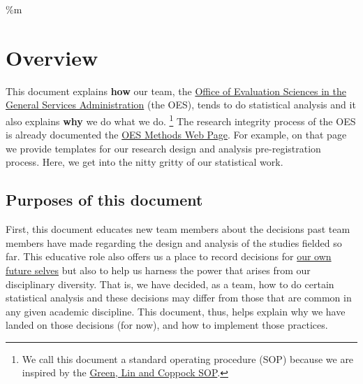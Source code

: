 \documentclass[
  12pt,
]{book}
\theoremstyle{definition}
\theoremstyle{definition}
\theoremstyle{definition}
\theoremstyle{remark}
\begin{document}
\newcommand{\var}{\mathrm{Var}}
\newcommand{\sd}{\mathrm{sd}}
\newcommand{\cov}{\mathrm{Cov}}
\newcommand{\cor}{\mathrm{Cor}}
\newcommand{\pr}{\text{Pr}}
\newcommand{\rank}{\text{rank}}
\newcommand{\Dt}{\Delta t}
\newcommand{\by}{\mathbf{y}}
\newcommand{\bY}{\mathbf{Y}}
\newcommand{\br}{\mathbf{r}}
\newcommand{\bv}{\mathbf{v}}
\newcommand{\bw}{\mathbf{w}}
\newcommand{\bx}{\mathbf{x}}
\newcommand{\bX}{\mathbf{X}}
\newcommand{\bZ}{\mathbf{Z}}
\newcommand{\bR}{\mathbf{R}}
\newcommand{\bz}{\mathbf{z}}
\newcommand{\be}{\mathbf{e}}
\newcommand{\bE}{\mathbf{E}}
\newcommand{\bI}{\mathbf{I}}
\newcommand{\bV}{\mathbf{V}}
\newcommand{\bpsi}{\boldsymbol{\psi}}
\newcommand{\bmu}{\boldsymbol{\mu}}

\%m \newcommand{\bbeta}{\boldsymbol{\beta}}
\newcommand{\btheta}{\boldsymbol{\theta}}
\newcommand{\btau}{\boldsymbol{\tau}}
\newcommand{\balpha}{\boldsymbol{\alpha}}
\newcommand{\bgamma}{\boldsymbol{\gamma}}
\newcommand{\blambda}{\boldsymbol{\lambda}}
\newcommand{\bSigma}{\boldsymbol{\Sigma}}

\hypertarget{overview}{%
\chapter*{Overview}\label{overview}}

This document explains \textbf{how} our team, the
\href{https://oes.gsa.gov/}{Office of Evaluation Sciences in the General
Services Administration} (the OES), tends to do statistical analysis and
it also explains \textbf{why} we do what we do. \footnote{We call this
  document a standard operating procedure (SOP) because we are inspired
  by the \href{https://github.com/acoppock/Green-Lab-SOP}{Green, Lin and
  Coppock SOP}.} The research integrity process of the OES is already
documented the \href{https://oes.gsa.gov/methods/}{OES Methods Web
Page}. For example, on that page we provide templates for our research
design and analysis pre-registration process. Here, we get into the
nitty gritty of our statistical work.

\hypertarget{purposes-of-this-document}{%
\section*{Purposes of this document}\label{purposes-of-this-document}}

First, this document educates new team members about the decisions past
team members have made regarding the design and analysis of the studies
fielded so far. This educative role also offers us a place to record
decisions for
\href{http://dx.doi.org/10.4067/S0718-090X2016000300011}{our own future
selves} but also to help us harness the power that arises from our
disciplinary diversity. That is, we have decided, as a team, how to do
certain statistical analysis and these decisions may differ from those
that are common in any given academic discipline. This document, thus,
helps explain why we have landed on those decisions (for now), and how
to implement those practices.
\end{document}
